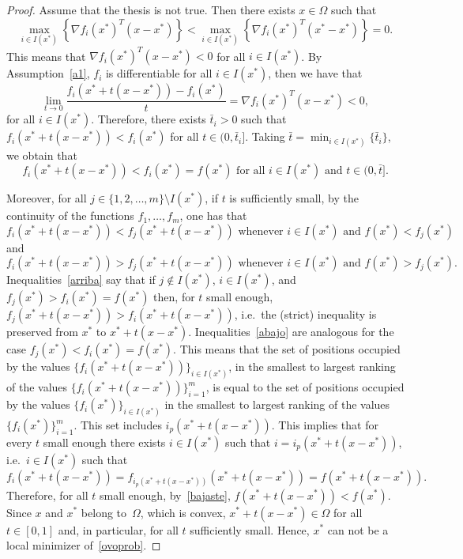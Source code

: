 \documentclass[11pt]{article}
\begin{document}
\begin{proof}
Assume that the thesis is not true. Then there exists $x \in \Omega$ such that
\[
\max_{i \in I(x^*)} \left\{ \nabla f_i(x^*)^T (x - x^*) \right\} <
\max_{i \in I(x^*)} \left\{ \nabla f_i(x^*)^T (x^* - x^*) \right\} = 0.
\]
This means that  $\nabla f_i(x^*)^T(x - x^*) < 0$ for all $i \in I(x^*)$. By Assumption~\ref{a1}, $f_i$ is differentiable for all $i\in I(x^*)$, then we have that
\[
\lim_{t\to 0}\dfrac{f_i(x^*+t(x-x^*))-f_i(x^*)}{t} = \nabla f_i(x^*)^T(x - x^*) < 0,
\]
for all $i\in I(x^*)$. Therefore, there exists $\bar t_i > 0$ such that $f_i(x^* + t (x - x^*)) < f_i(x^*)$ for all $t \in (0, \bar t_i]$. Taking $\bar t = \min_{i \in I(x^*)} \{\bar t_i \}$, we obtain that
\begin{equation} \label{bajaste}
f_i(x^* + t (x - x^*)) < f_i(x^*) = f(x^*) \mbox{ for all } i \in I(x^*) \mbox{ and } t \in (0, \bar t].
\end{equation}

Moreover, for all $j \in \{1,2,\dots,m\} \setminus I(x^*)$, if $t$ is sufficiently small, by the continuity of the functions $f_1,\dots,f_m$, one has that
\begin{equation} \label{arriba}
f_i(x^* + t(x - x^*)) < f_j(x^* + t(x - x^*)) \mbox{ whenever } i \in I(x^*) \mbox{ and } f(x^*) < f_j(x^*)
\end{equation}
and 
\begin{equation} \label{abajo}
f_i(x^* + t(x - x^*)) > f_j(x^* + t(x - x^*)) \mbox{ whenever } i \in I(x^*) \mbox{ and } f(x^*) > f_j(x^*).
\end{equation}
Inequalities~\eqref{arriba} say that if $j \not \in I(x^*)$, $i \in I(x^*)$, and $f_j(x^*) > f_i(x^*) = f(x^*)$ then, for $t$ small enough, $f_j(x^*+t(x-x^*)) > f_i(x^*+t(x-x^*))$, i.e.\ the (strict) inequality is preserved from $x^*$ to $x^*+t(x-x^*)$. Inequalities~\eqref{abajo} are analogous for the case $f_j(x^*) < f_i(x^*) = f(x^*)$. This means that the set of positions occupied by the values $\{f_i(x^*+t(x-x^*))\}_{i \in I(x^*)}$, in the smallest to largest ranking of the values $\{f_i(x^*+t(x-x^*))\}_{i=1}^m$, is equal to the set of positions occupied by the values $\{f_i(x^*)\}_{i \in I(x^*)}$ in the smallest to largest ranking of the values $\{f_i(x^*)\}_{i=1}^m$. This set includes $i_p(x^*+t(x-x^*))$. This implies that for every $t$ small enough there exists $i \in I(x^*)$ such that $i=i_p(x^*+t(x-x^*))$, i.e.\ $i \in I(x^*)$ such that
\[
f_i(x^*+t(x-x^*))=f_{i_p(x^*+t(x-x^*))}(x^*+t(x-x^*))=f(x^*+t(x-x^*)).
\]
Therefore, for all $t$ small enough, by~\eqref{bajaste}, $f(x^* + t(x - x^*)) < f(x^*)$. Since $x$ and $x^*$ belong to~$\Omega$, which is convex, $x^* + t(x - x^*) \in \Omega$ for all $t \in [0,1]$ and, in particular, for all $t$ sufficiently small. Hence, $x^*$ can not be a local minimizer of~\eqref{ovoprob}.
\end{proof}
\end{document}
